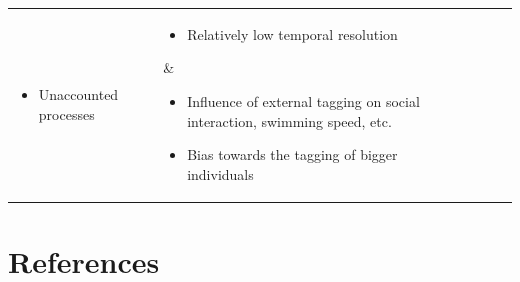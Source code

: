 \documentclass[12pt,authoryear]{elsarticle}
\begin{document}
\begin{landscape}
\begin{table}[ht!]
\begin{center}
\begin{tabular}{|l|l|l|l|l|l|}
{\begin{itemize}[leftmargin=1em,itemsep=1pt,parsep=0pt]
\item Unaccounted processes
\end{itemize}} & \parbox[t]{0.25\textwidth}{%
\begin{itemize}[leftmargin=1em,itemsep=1pt,parsep=0pt]\raggedright%
\item Relatively low temporal resolution
\end{itemize}} & \parbox[t]{0.25\textwidth}{%
\begin{itemize}[leftmargin=1em,itemsep=1pt,parsep=0pt]\raggedright%
\item Influence of external tagging on social interaction, swimming speed, etc.
\item Bias towards the tagging of bigger individuals
\end{itemize}}\\    \hline
\end{tabular}
\end{center}
\end{table}
\end{landscape}







\newpage
\section*{References}







\end{document}
